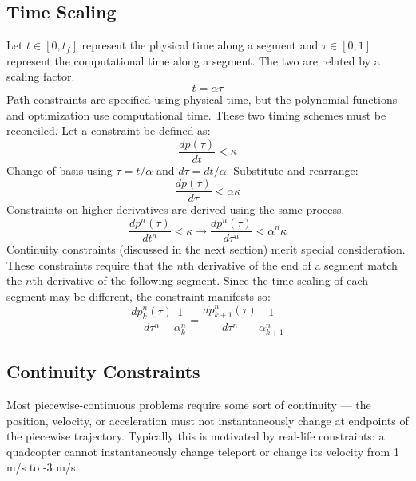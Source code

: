 \documentclass[12pt]{article}
\begin{document}
\subsection{Time Scaling}
Let $t \in [0, t_{f}]$ represent the physical time along a segment and $\tau \in
[0, 1]$ represent the computational time along a segment. The two are related by
a scaling factor.
%
\begin{equation}
  t = \alpha \tau
\end{equation}
%
Path constraints are specified using physical time, but the polynomial functions
and optimization use computational time. These two timing schemes must be
reconciled. Let a constraint be defined as:
%
\begin{equation*}
  \frac{dp(\tau)}{dt} < \kappa
\end{equation*}
%
Change of basis using $\tau = t / \alpha$ and $d\tau = dt / \alpha$. Substitute
and rearrange:
%
\begin{equation}
  \frac{dp(\tau)}{d\tau} < \alpha \kappa
\end{equation}
%
Constraints on higher derivatives are derived using the same process.
\begin{equation}
  \frac{dp^{n}(\tau)}{dt^{n}} < \kappa \rightarrow
  \frac{dp^{n}(\tau)}{d\tau^{n}} < \alpha^{n} \kappa
\end{equation}
%
Continuity constraints (discussed in the next section) merit special
consideration. These constraints require that the $n$th derivative of the end of
a segment match the $n$th derivative of the following segment. Since the time
scaling of each segment may be different, the constraint manifests so:
\begin{equation}
  \frac{dp_{k}^{n}(\tau)}{d\tau^{n}} \frac{1}{\alpha_{k}^{n}} =
  \frac{dp_{k+1}^{n}(\tau)}{d\tau^{n}} \frac{1}{\alpha_{k+1}^{n}}
\end{equation}

\subsection{Continuity Constraints}
Most piecewise-continuous problems require some sort of continuity --- the
position, velocity, or acceleration must not instantaneously change at endpoints
of the piecewise trajectory. Typically this is motivated by real-life
constraints: a quadcopter cannot instantaneously change teleport or change its
velocity from 1 m/s to -3 m/s.
\end{document}
